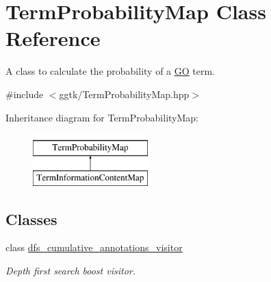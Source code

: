 \hypertarget{classTermProbabilityMap}{}\section{Term\+Probability\+Map Class Reference}
\label{classTermProbabilityMap}


A class to calculate the probability of a \hyperlink{namespaceGO}{GO} term.  




{\ttfamily \#include $<$ggtk/\+Term\+Probability\+Map.\+hpp$>$}

Inheritance diagram for Term\+Probability\+Map\+:\begin{figure}[H]
\begin{center}
\leavevmode
\includegraphics[height=2.000000cm]{classTermProbabilityMap}
\end{center}
\end{figure}
\subsection*{Classes}
\begin{DoxyCompactItemize}
\item 
class \hyperlink{classTermProbabilityMap_1_1dfs__cumulative__annotations__visitor}{dfs\+\_\+cumulative\+\_\+annotations\+\_\+visitor}
\begin{DoxyCompactList}\small\item\em Depth first search boost visitor. \end{DoxyCompactList}\end{DoxyCompactItemize}
